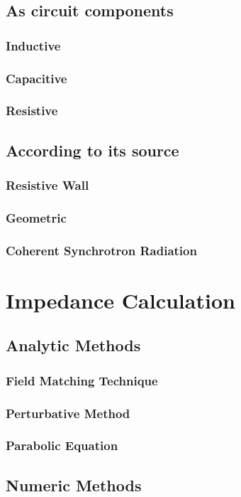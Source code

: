 \documentclass[
	12pt,				%
	openright,			%
	oneside,			%
	a4paper,		%
	chapter=TITLE,		%
	section=TITLE,		%
    brazil,				%
	english,			%
	sumario=tradicional,
	]{abntex2}
\begin{document}
    \subsection{As circuit components}
      \subsubsection{Inductive}
      \subsubsection{Capacitive}
      \subsubsection{Resistive}
    \subsection{According to its source}
      \subsubsection{Resistive Wall}
      \subsubsection{Geometric}
      \subsubsection{Coherent Synchrotron Radiation}
  \section{Impedance Calculation}
    \subsection{Analytic Methods}
      \subsubsection{Field Matching Technique}
      \subsubsection{Perturbative Method}
      \subsubsection{Parabolic Equation}
    \subsection{Numeric Methods}
\end{document}
